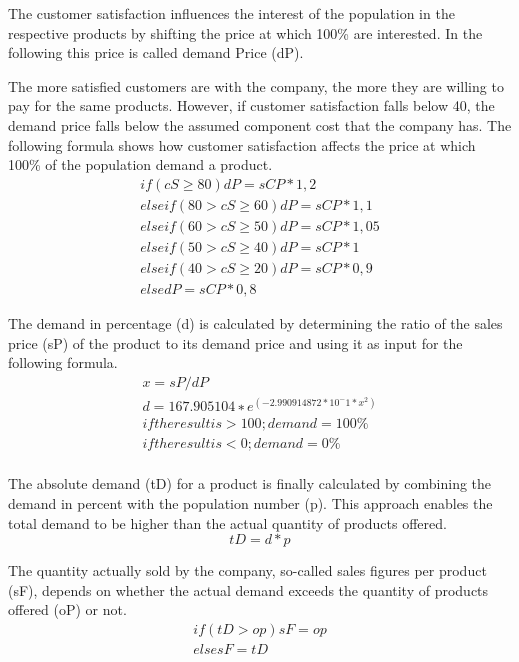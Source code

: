 The customer satisfaction influences the interest of the population in the respective products by shifting the price at which 100\% are interested. In the following this price is called demand Price (dP).
 
The more satisfied customers are with the company, the more they are willing to pay for the same products. However, if customer satisfaction falls below 40, the demand price falls below the assumed component cost that the company has. The following formula shows how customer satisfaction affects the price at which 100\% of the population demand a product.
\begin{equation}
\begin{aligned}
if ( cS \geq 80 ) { dP = sCP * 1,2 } \\
elseif ( 80 > cS \geq 60 ){ dP = sCP * 1,1 } \\
elseif ( 60 > cS \geq 50 ) { dP = sCP * 1,05 } \\
elseif ( 50 > cS \geq 40 ) { dP = sCP * 1 } \\
elseif ( 40 > cS \geq 20 ) { dP = sCP * 0,9 } \\
else { dP = sCP * 0,8 }  
\end{aligned}
\end{equation}

The demand in percentage (d) is calculated by determining the ratio of the sales price (sP) of the product to its demand price and using it as input for the following formula.
\begin{equation}
\begin{aligned}
x = sP / dP \\
d = 167.905104 ∗e^ (−2.990914872 * 10^ -1 * x^2) \\
if the result is > 100; demand = 100\% \\
if the result is < 0; demand = 0\% \\    
\end{aligned}
\end{equation}
 
The absolute demand (tD) for a product is finally calculated by combining the demand in percent with the population number (p). This approach enables the total demand to be higher than the actual quantity of products offered.
\begin{equation}
tD= d * p    
\end{equation}

The quantity actually sold by the company, so-called sales figures per product (sF), depends on whether the actual demand exceeds the quantity of products offered (oP) or not.
\begin{equation}
\begin{aligned}
if ( tD > op ) { sF = op } \\
else { sF = tD }    
\end{aligned}
\end{equation}

